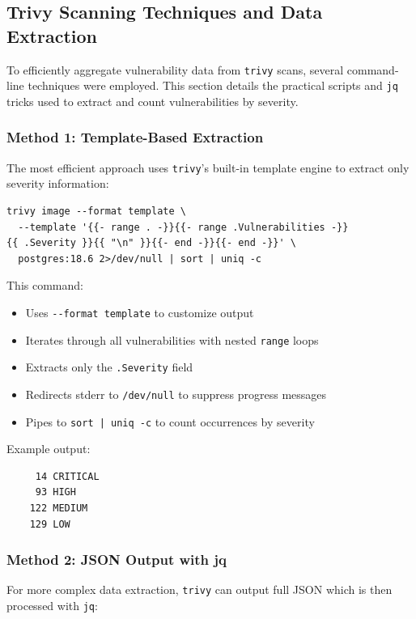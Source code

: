 \documentclass[11pt, a4paper]{article}
\begin{document}
\subsection{Trivy Scanning Techniques and Data Extraction}

To efficiently aggregate vulnerability data from \texttt{trivy} scans, several command-line techniques were employed. This section details the practical scripts and \texttt{jq} tricks used to extract and count vulnerabilities by severity.

\subsubsection{Method 1: Template-Based Extraction}

The most efficient approach uses \texttt{trivy}'s built-in template engine to extract only severity information:

\begin{verbatim}
trivy image --format template \
  --template '{{- range . -}}{{- range .Vulnerabilities -}}
{{ .Severity }}{{ "\n" }}{{- end -}}{{- end -}}' \
  postgres:18.6 2>/dev/null | sort | uniq -c
\end{verbatim}

\noindent This command:
\begin{itemize}
    \item Uses \texttt{-{}-format template} to customize output
    \item Iterates through all vulnerabilities with nested \texttt{range} loops
    \item Extracts only the \texttt{.Severity} field
    \item Redirects stderr to \texttt{/dev/null} to suppress progress messages
    \item Pipes to \texttt{sort | uniq -c} to count occurrences by severity
\end{itemize}

\noindent Example output:
\begin{verbatim}
     14 CRITICAL
     93 HIGH
    122 MEDIUM
    129 LOW
\end{verbatim}

\subsubsection{Method 2: JSON Output with jq}

For more complex data extraction, \texttt{trivy} can output full JSON which is then processed with \texttt{jq}:
\end{document}
